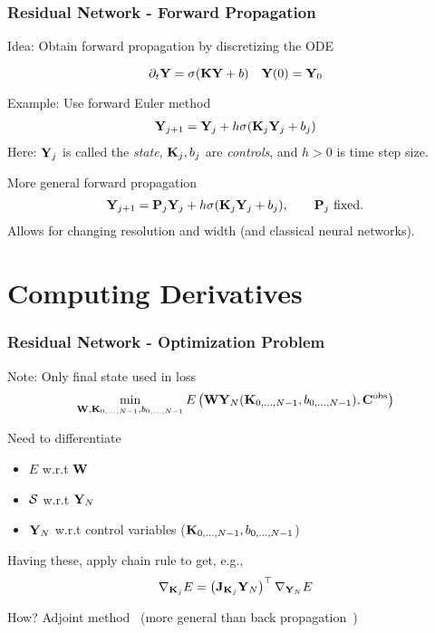 \documentclass[12pt,fleqn, beamer]{beamer}
\begin{document}
\begin{frame}\frametitle{Residual Network - Forward Propagation}

Idea: Obtain forward propagation by discretizing the ODE

$$ \partial_t{{\bf Y}} = \sigma( {\bf K}{\bf Y} + b) \quad {\bf Y}(0) = {\bf Y}_0 $$

\bigskip
\pause

Example: Use forward Euler method
\begin{eqnarray*}
{\bf Y}_{j+1} = {\bf Y}_j + h \sigma( {\bf K}_j{\bf Y}_j + b_j)
\end{eqnarray*}
Here: ${\bf Y}_j$ is called the \emph{state}, ${\bf K}_j, b_j$ are \emph{controls}, and $h>0$ is time step size.

\bigskip
\pause

More general forward propagation
\begin{eqnarray*}
{\bf Y}_{j+1} =  {\bf P}_j {\bf Y}_j + h \sigma({\bf K}_j{\bf Y}_j  + b_j), \qquad {\bf P}_j \text{ fixed.}
\end{eqnarray*}
Allows for changing resolution and width (and classical neural networks).


\end{frame}

\section{Computing Derivatives} %
\begin{frame}\frametitle{Residual Network - Optimization Problem}


Note: Only final state used in loss
$$ \min_{{\bf W}, {\bf K}_{0,\ldots,N-1},b_{0,\ldots,N-1}}E\left(
{\bf W} {\bf Y}_N({\bf K}_{0,\ldots,N-1},b_{0,\ldots,N-1}),{\bf C}^{\rm obs}\right) $$

\bigskip
\pause

Need to differentiate
\begin{itemize}
\item $E$ w.r.t ${\bf W}$

\item ${\cal S}$ w.r.t ${\bf Y}_N$

\item ${\bf Y}_N$ w.r.t control variables (${\bf K}_{0,\ldots,N-1},b_{0,\ldots,N-1}$)
\end{itemize}

\bigskip
\pause

Having these, apply chain rule to get, e.g.,
$$
\nabla_{{\bf K}_j} E =  \left({\bf J}_{{\bf K}_j} {{\bf Y}_N}\right)^{\top} \nabla_{{\bf Y}_N} E
$$

How? Adjoint method~\cite{bliss1919,BorzSchulz2012} (more general than back propagation~\cite{Rumelhart1986})
\end{frame}
\end{document}
